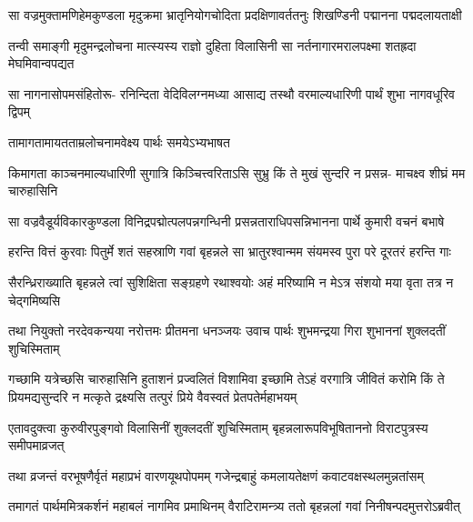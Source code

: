 \fourlineindentedshloka
{सा वज्रमुक्तामणिहेमकुण्डला}
{मृदुक्रमा भ्रातृनियोगचोदिता}
{प्रदक्षिणावर्ततनुः शिखण्डिनी}
{पद्मानना पद्मदलायताक्षी}


\fourlineindentedshloka
{तन्वी समाङ्गी मृदुमन्द्रलोचना}
{मात्स्यस्य राज्ञो दुहिता विलासिनी}
{सा नर्तनागारमरालपक्ष्मा}
{शतह्रदा मेघमिवान्वपद्यत}


\fourlineindentedshloka
{सा नागनासोपमसंहितोरू-}
{रनिन्दिता वेदिविलग्नमध्या}
{आसाद्य तस्थौ वरमाल्यधारिणी}
{पार्थं शुभा नागवधूरिव द्विपम्}


\onelineshloka
{तामागतामायतताम्रलोचनामवेक्ष्य पार्थः समयेऽभ्यभाषत}

\fourlineindentedshloka
{किमागता काञ्चनमाल्यधारिणी}
{सुगात्रि किञ्चित्त्वरिताऽसि सुभ्रु}
{किं ते मुखं सुन्दरि न प्रसन्न-}
{माचक्ष्व शीघ्रं मम चारुहासिनि}



\twolineshloka
{सा वज्रवैडूर्यविकारकुण्डला विनिद्रपद्मोत्पलपन्नगन्धिनी}
{प्रसन्नताराधिपसन्निभानना पार्थे कुमारी वचनं बभाषे}




\twolineshloka
{हरन्ति वित्तं कुरवाः पितुर्मे शतं सहस्राणि गवां बृहन्नले}
{सा भ्रातुरश्वान्मम संयमस्व पुरा परे दूरतरं हरन्ति गाः}


\twolineshloka
{सैरन्ध्रिराख्याति बृहन्नले त्वां सुशिक्षिता सङ्ग्रहणे रथाश्वयोः}
{अहं मरिष्यामि न मेऽत्र संशयो मया वृता तत्र न चेद्गमिष्यसि}



\twolineshloka
{तथा नियुक्तो नरदेवकन्यया नरोत्तमः प्रीतमना धनञ्जयः}
{उवाच पार्थः शुभमन्द्रया गिरा शुभाननां शुक्लदतीं शुचिस्मिताम्}


\threelineshloka
{गच्छामि यत्रेच्छसि चारुहासिनि हुताशनं प्रज्वलितं विशामिवा}
{इच्छामि तेऽहं वरगात्रि जीवितं करोमि किं ते प्रियमद्यसुन्दरि}
{न मत्कृते द्रक्ष्यसि तत्पुरं प्रिये वैवस्वतं प्रेतपतेर्महाभयम्}



\twolineshloka
{एतावदुक्त्वा कुरुवीरपुङ्गवो विलासिनीं शुक्लदतीं शुचिस्मिताम्}
{बृहन्नलारूपविभूषिताननो विराटपुत्रस्य समीपमाव्रजत्}


\twolineshloka
{तथा व्रजन्तं वरभूषणैर्वृतं महाप्रभं वारणयूथपोपमम्}
{गजेन्द्रबाहुं कमलायतेक्षणं कवाटवक्षस्थलमुन्नतांसम्}


\twolineshloka
{तमागतं पार्थममित्रकर्शनं महाबलं नागमिव प्रमाथिनम्}
{वैराटिरामन्त्र्य ततो बृहन्नलां गवां निनीषन्पदमुत्तरोऽब्रवीत्}


